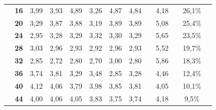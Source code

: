 \begin{table}[H]
\begin{tabular}{lc|c|c|c|c|c|c|lcccl}
		\multicolumn{1}{|l|}{}                                & {\bf 16}              & 3,99    & 3,93    & 4,89     & 3,26     & 4,87     & 4,84     & \multicolumn{1}{l|}{} & \multicolumn{1}{c|}{4,18}     & \multicolumn{1}{c|}{} & \multicolumn{1}{c|}{26,1\%}     &  \\ \cline{2-8} \cline{10-10} \cline{12-12}
		\multicolumn{1}{|l|}{}                                & {\bf 20}              & 3,29    & 3,87    & 3,88     & 3,19     & 3,89     & 3,89     & \multicolumn{1}{l|}{} & \multicolumn{1}{c|}{5,08}     & \multicolumn{1}{c|}{} & \multicolumn{1}{c|}{25,4\%}     &  \\ \cline{2-8} \cline{10-10} \cline{12-12}
		\multicolumn{1}{|l|}{}                                & {\bf 24}              & 2,95    & 3,28    & 3,29     & 3,32     & 3,30     & 3,29     & \multicolumn{1}{l|}{} & \multicolumn{1}{c|}{5,65}     & \multicolumn{1}{c|}{} & \multicolumn{1}{c|}{23,5\%}     &  \\ \cline{2-8} \cline{10-10} \cline{12-12}
		\multicolumn{1}{|l|}{}                                & {\bf 28}              & 3,03    & 2,96    & 2,93     & 2,92     & 2,96     & 2,93     & \multicolumn{1}{l|}{} & \multicolumn{1}{c|}{5,52}     & \multicolumn{1}{c|}{} & \multicolumn{1}{c|}{19,7\%}     &  \\ \cline{2-8} \cline{10-10} \cline{12-12}
		\multicolumn{1}{|l|}{}                                & {\bf 32}              & 2,85    & 2,72    & 2,80     & 2,70     & 3,00     & 2,80     & \multicolumn{1}{l|}{} & \multicolumn{1}{c|}{5,86}     & \multicolumn{1}{c|}{} & \multicolumn{1}{c|}{18,3\%}     &  \\ \cline{2-8} \cline{10-10} \cline{12-12}
		\multicolumn{1}{|l|}{}                                & {\bf 36}              & 3,74    & 3,81    & 3,29     & 3,48     & 2,85     & 3,28     & \multicolumn{1}{l|}{} & \multicolumn{1}{c|}{4,46}     & \multicolumn{1}{c|}{} & \multicolumn{1}{c|}{12,4\%}     &  \\ \cline{2-8} \cline{10-10} \cline{12-12}
		\multicolumn{1}{|l|}{}                                & {\bf 40}              & 4,12    & 4,06    & 3,79     & 3,98     & 3,85     & 3,81     & \multicolumn{1}{l|}{} & \multicolumn{1}{c|}{4,05}     & \multicolumn{1}{c|}{} & \multicolumn{1}{c|}{10,1\%}     &  \\ \cline{2-8} \cline{10-10} \cline{12-12}
		\multicolumn{1}{|l|}{}                                & {\bf 44}              & 4,00    & 4,06    & 4,05     & 3,83     & 3,75     & 3,74     & \multicolumn{1}{l|}{} & \multicolumn{1}{c|}{4,18}     & \multicolumn{1}{c|}{} & \multicolumn{1}{c|}{9,5\%}      &  \\ \cline{2-8} \cline{10-10} \cline{12-12}

\end{tabular}
\end{table}
